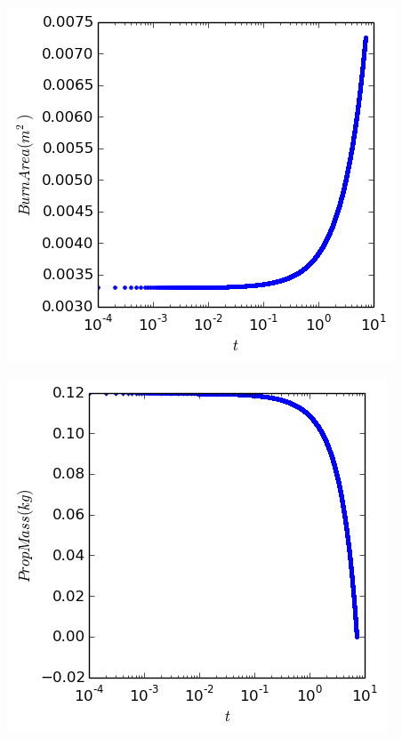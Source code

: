 \documentclass[cleanfoot,cleanhead,twocolumn,10pt,notitlepage]{asme2e}
\begin{document}
\includegraphics[width=\linewidth]{../python_stuff/Part1/BurnArea.png}

\includegraphics[width=\linewidth]{../python_stuff/Part1/PropMass.png}
\end{document}
